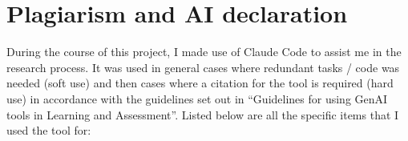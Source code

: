 \clearpage
\section*{Plagiarism and AI declaration}
\label{sec:plagiarism}
During the course of this project, I made use of Claude Code to assist me in the research process. It was used in general cases where redundant tasks / code was needed (soft use) and then cases where a citation for the tool is required (hard use) in accordance with the guidelines set out in ``Guidelines for using GenAI tools in Learning and Assessment''. Listed below are all the specific items that I used the tool for:
